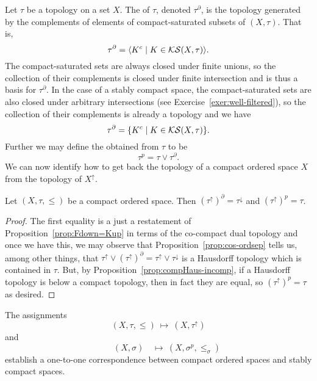  Let $\tau$ be a topology on a set $X$. The  of $\tau$, denoted $\tau^\partial$, is the topology generated by the complements of elements of compact-saturated subsets of $(X,\tau)$. That is,
 \[
 \tau^\partial=\langle K^c\mid K\in\mathcal{KS}(X,\tau)\rangle.
 \]
 The compact-saturated sets are always closed under finite unions, so the collection of their complements is closed under finite intersection and is thus a basis for $\tau^\partial$. In the case of a stably compact space, the compact-saturated sets are also closed under arbitrary intersections (see Exercise~\ref{exer:well-filtered}), so the collection of their complements is already a topology and we have
 \[
 \tau^\partial=\{ K^c\mid K\in\mathcal{KS}(X,\tau)\}.
 \]
 Further we may define the  obtained from $\tau$ to be
 \[
 \tau^p=\tau\vee\tau^\partial.
 \]
 We can now identify how to get back the topology of a compact ordered space $X$ from the topology of $X^\uparrow$.
 
 \begin{proposition}\label{prop:compordaspatch}
 Let $(X,\tau,\leq)$ be a compact ordered space. Then $(\tau^\uparrow)^\partial=\tau^\downarrow$ and
 $(\tau^\uparrow)^p=\tau$.
 \end{proposition}
 
 \begin{proof}
 The first equality is a just a restatement of Proposition~\ref{prop:Fdown=Kup} in terms of the co-compact dual topology and once we have this, we may observe that Proposition~\ref{prop:cos-ordsep} tells us, among other things, that $\tau^\uparrow\vee(\tau^\uparrow)^\partial=\tau^\uparrow\vee\tau^\downarrow$ is a Hausdorff topology which is contained in $\tau$. But, by Proposition~\ref{prop:compHaus-incomp}, if a Hausdorff topology is below a compact topology, then in fact they are equal, so $(\tau^\uparrow)^p=\tau$ as desired.
 \end{proof}
 
 
 
 \begin{theorem}\label{thrm:COSpace-StabCompSp}
 The assignments
 \[
 (X,\tau,\leq)\ \mapsto \ (X,\tau^\uparrow)
 \]
 and
 \[
 \qquad(X,\sigma)\quad \mapsto \ (X,\sigma^p,\leq_\sigma)
 \]
 establish a one-to-one correspondence between compact ordered spaces and stably compact spaces.%
 \end{theorem}
 
